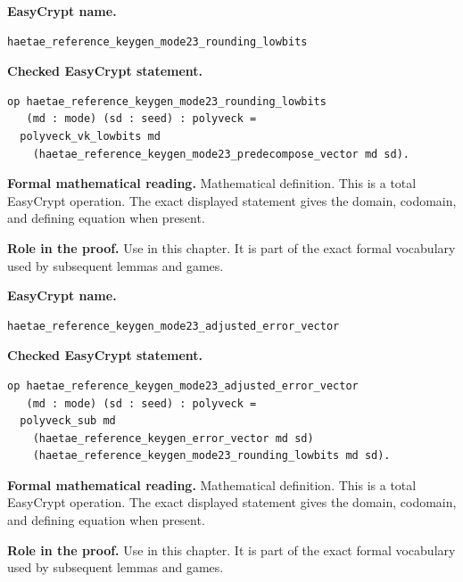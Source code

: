 \begin{formaldefinition}
\noindent\textbf{EasyCrypt name.}
\begin{lstlisting}[language=EasyCrypt,basicstyle=\ttfamily\scriptsize]
haetae_reference_keygen_mode23_rounding_lowbits
\end{lstlisting}
\noindent\textbf{Checked EasyCrypt statement.}
\begin{lstlisting}[language=EasyCrypt,basicstyle=\ttfamily\scriptsize]
op haetae_reference_keygen_mode23_rounding_lowbits
   (md : mode) (sd : seed) : polyveck =
  polyveck_vk_lowbits md
    (haetae_reference_keygen_mode23_predecompose_vector md sd).
\end{lstlisting}
\noindent\textbf{Formal mathematical reading.}
Mathematical definition. This is a total EasyCrypt operation.  The exact displayed statement gives the domain, codomain, and defining equation when present.

\noindent\textbf{Role in the proof.}
Use in this chapter. It is part of the exact formal vocabulary used by subsequent lemmas and games.

\end{formaldefinition}

\begin{formaldefinition}
\noindent\textbf{EasyCrypt name.}
\begin{lstlisting}[language=EasyCrypt,basicstyle=\ttfamily\scriptsize]
haetae_reference_keygen_mode23_adjusted_error_vector
\end{lstlisting}
\noindent\textbf{Checked EasyCrypt statement.}
\begin{lstlisting}[language=EasyCrypt,basicstyle=\ttfamily\scriptsize]
op haetae_reference_keygen_mode23_adjusted_error_vector
   (md : mode) (sd : seed) : polyveck =
  polyveck_sub md
    (haetae_reference_keygen_error_vector md sd)
    (haetae_reference_keygen_mode23_rounding_lowbits md sd).
\end{lstlisting}
\noindent\textbf{Formal mathematical reading.}
Mathematical definition. This is a total EasyCrypt operation.  The exact displayed statement gives the domain, codomain, and defining equation when present.

\noindent\textbf{Role in the proof.}
Use in this chapter. It is part of the exact formal vocabulary used by subsequent lemmas and games.

\end{formaldefinition}

